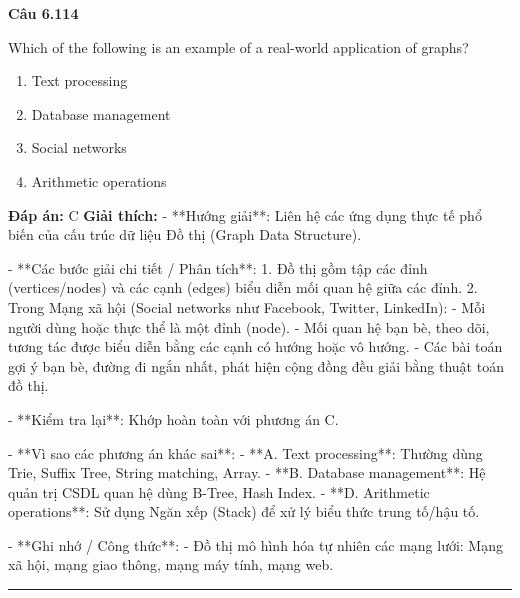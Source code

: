 \documentclass[11pt,a4paper]{article}
\newenvironment{question}[1]{%
  \par\vspace{1em}\noindent\textbf{\large Câu #1}\par\vspace{0.4em}
}{%
  \par\vspace{1em}\hrule\vspace{0.6em}
}
\newenvironment{choices}{%
  \begin{enumerate}[label=\textbf{\Alph*.},leftmargin=2.2em,itemsep=2pt,topsep=3pt]
}{%
  \end{enumerate}
}
\newcommand{\choice}{\item}
\begin{document}
\begin{question}{6.114}
Which of the following is an example of a real-world application of graphs?
\begin{choices}
\choice Text processing
\choice Database management
\choice Social networks
\choice Arithmetic operations
\end{choices}
\textbf{Đáp án:} C
\textbf{Giải thích:} - **Hướng giải**:
  Liên hệ các ứng dụng thực tế phổ biến của cấu trúc dữ liệu Đồ thị (Graph Data Structure).

- **Các bước giải chi tiết / Phân tích**:
  1. Đồ thị gồm tập các đỉnh (vertices/nodes) và các cạnh (edges) biểu diễn mối quan hệ giữa các đỉnh.
  2. Trong Mạng xã hội (Social networks như Facebook, Twitter, LinkedIn):
     - Mỗi người dùng hoặc thực thể là một đỉnh (node).
     - Mối quan hệ bạn bè, theo dõi, tương tác được biểu diễn bằng các cạnh có hướng hoặc vô hướng.
     - Các bài toán gợi ý bạn bè, đường đi ngắn nhất, phát hiện cộng đồng đều giải bằng thuật toán đồ thị.

- **Kiểm tra lại**:
  Khớp hoàn toàn với phương án C.

- **Vì sao các phương án khác sai**:
  - **A. Text processing**: Thường dùng Trie, Suffix Tree, String matching, Array.
  - **B. Database management**: Hệ quản trị CSDL quan hệ dùng B-Tree, Hash Index.
  - **D. Arithmetic operations**: Sử dụng Ngăn xếp (Stack) để xử lý biểu thức trung tố/hậu tố.

- **Ghi nhớ / Công thức**:
  - Đồ thị mô hình hóa tự nhiên các mạng lưới: Mạng xã hội, mạng giao thông, mạng máy tính, mạng web.
\end{question}
\end{document}
